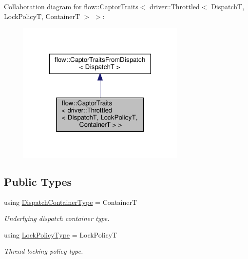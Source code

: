Collaboration diagram for flow\+:\+:Captor\+Traits$<$ driver\+:\+:Throttled$<$ DispatchT, Lock\+PolicyT, ContainerT $>$ $>$\+:\nopagebreak
\begin{figure}[H]
\begin{center}
\leavevmode
\includegraphics[width=236pt]{structflow_1_1_captor_traits_3_01driver_1_1_throttled_3_01_dispatch_t_00_01_lock_policy_t_00_01_45a3c5c2767eed7680aed2d7d1e65966}
\end{center}
\end{figure}
\subsection*{Public Types}
\begin{DoxyCompactItemize}
\item 
\mbox{\label{structflow_1_1_captor_traits_3_01driver_1_1_throttled_3_01_dispatch_t_00_01_lock_policy_t_00_01_container_t_01_4_01_4_aa944224f31cf4e8d512e3296f06679b2}} 
using \hyperlink{structflow_1_1_captor_traits_3_01driver_1_1_throttled_3_01_dispatch_t_00_01_lock_policy_t_00_01_container_t_01_4_01_4_aa944224f31cf4e8d512e3296f06679b2}{Dispatch\+Container\+Type} = ContainerT
\begin{DoxyCompactList}\small\item\em Underlying dispatch container type. \end{DoxyCompactList}\item 
\mbox{\label{structflow_1_1_captor_traits_3_01driver_1_1_throttled_3_01_dispatch_t_00_01_lock_policy_t_00_01_container_t_01_4_01_4_a4f11fda543cfc095f4a446120184296e}} 
using \hyperlink{structflow_1_1_captor_traits_3_01driver_1_1_throttled_3_01_dispatch_t_00_01_lock_policy_t_00_01_container_t_01_4_01_4_a4f11fda543cfc095f4a446120184296e}{Lock\+Policy\+Type} = Lock\+PolicyT
\begin{DoxyCompactList}\small\item\em Thread locking policy type. \end{DoxyCompactList}\end{DoxyCompactItemize}


